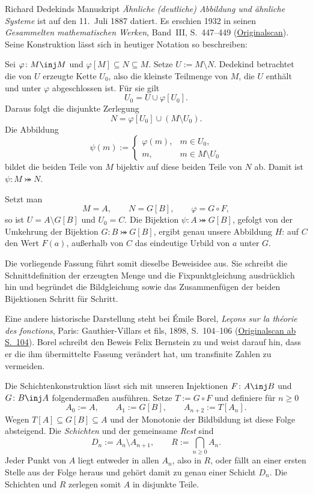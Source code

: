Richard Dedekinds Manuskript \emph{Ähnliche (deutliche) Abbildung und
ähnliche Systeme} ist auf den 11.~Juli 1887 datiert. Es erschien 1932
in seinen \emph{Gesammelten mathematischen Werken}, Band~III,
S.~447--449
(\href{https://rcin.org.pl/Content/142326/PDF/WA35_176323_15883-3_Art17.pdf}{Originalscan}).
Seine Konstruktion lässt sich in heutiger Notation so beschreiben:

Sei \(\varphi\colon M\inj M\) und
\(\varphi[M]\subseteq N\subseteq M\). Setze \(U:=M\setminus N\).
Dedekind betrachtet die von \(U\) erzeugte Kette \(U_0\), also
die kleinste Teilmenge von \(M\), die \(U\) enthält und unter
\(\varphi\) abgeschlossen ist. Für sie gilt
\[
  U_0=U\cup\varphi[U_0].
\]
Daraus folgt die disjunkte Zerlegung
\[
  N=\varphi[U_0]\cup(M\setminus U_0).
\]
Die Abbildung
\[
  \psi(m):=\begin{cases}
    \varphi(m),&m\in U_0,\\
    m,&m\in M\setminus U_0
  \end{cases}
\]
bildet die beiden Teile von \(M\) bijektiv auf diese beiden Teile
von \(N\) ab. Damit ist \(\psi\colon M\bij N\).

Setzt man
\[
  M=A,\qquad N=G[B],\qquad \varphi=G\circ F,
\]
so ist \(U=A\setminus G[B]\) und \(U_0=C\).
Die Bijektion \(\psi\colon A\bij G[B]\), gefolgt von der
Umkehrung der Bijektion \(G\colon B\bij G[B]\), ergibt genau
unsere Abbildung \(H\): auf \(C\) den Wert \(F(a)\), außerhalb
von \(C\) das eindeutige Urbild von \(a\) unter \(G\).

Die vorliegende Fassung führt somit dieselbe Beweisidee aus. Sie schreibt
die Schnittdefinition der erzeugten Menge und die Fixpunktgleichung
ausdrücklich hin und begründet die Bildgleichung sowie das Zusammenfügen
der beiden Bijektionen Schritt für Schritt.

Eine andere historische Darstellung steht bei Émile Borel,
\emph{Leçons sur la théorie des fonctions}, Paris: Gauthier-Villars et fils,
1898, S.~104--106
(\href{https://archive.org/details/leconstheoriefon00borerich/page/n117/mode/2up}{Originalscan ab S.~104}).
Borel schreibt den Beweis Felix Bernstein zu und weist darauf hin,
dass er die ihm übermittelte Fassung verändert hat, um transfinite
Zahlen zu vermeiden.

Die Schichtenkonstruktion lässt sich mit unseren Injektionen
\(F\colon A\inj B\) und \(G\colon B\inj A\) folgendermaßen
ausführen. Setze \(T:=G\circ F\) und definiere für \(n\geq0\)
\[
  A_0:=A,\qquad A_1:=G[B],\qquad A_{n+2}:=T[A_n].
\]
Wegen \(T[A]\subseteq G[B]\subseteq A\) und der Monotonie der
Bildbildung ist diese Folge absteigend.
Die \emph{Schichten} und der gemeinsame \emph{Rest} sind
\[
  D_n:=A_n\setminus A_{n+1},\qquad
  R:=\bigcap_{n\geq0}A_n.
\]
Jeder Punkt von \(A\) liegt entweder in allen \(A_n\), also in
\(R\), oder fällt an einer ersten Stelle aus der Folge heraus und
gehört damit zu genau einer Schicht \(D_n\). Die Schichten und
\(R\) zerlegen somit \(A\) in disjunkte Teile.

